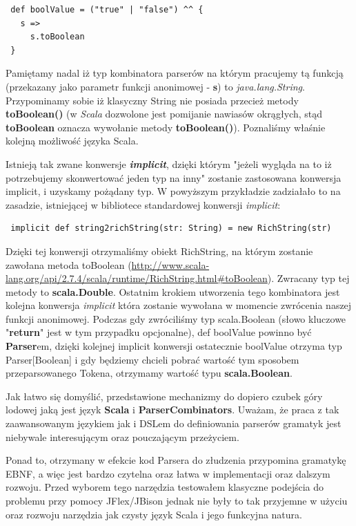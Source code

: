 \documentclass[a4paper]{article}
\begin{document}
\begin{verbatim}
 def boolValue = ("true" | "false") ^^ {
   s =>
     s.toBoolean
 }
\end{verbatim}

Pamiętamy nadal iż typ kombinatora parserów na którym pracujemy tą funkcją (przekazany jako parametr funkcji anonimowej - \textbf{s})
to \textit{java.lang.String}. Przypominamy sobie iż klasyczny String nie posiada przecież metody \textbf{toBoolean()} (w \textit{Scala} dozwolone jest 
pomijanie nawiasów okrągłych, stąd \textbf{toBoolean} oznacza wywołanie metody \textbf{toBoolean()}). Poznaliśmy właśnie kolejną możliwość języka Scala.

Istnieją tak zwane konwersje \textbf{\textit{implicit}}, dzięki którym "jeżeli wygląda na to iż potrzebujemy skonwertować jeden typ na inny" zostanie zastosowana
konwersja implicit, i uzyskamy pożądany typ. W powyższym przykładzie zadziałało to na zasadzie, istniejącej w bibliotece standardowej konwersji \textit{implicit}:

\begin{verbatim}
 implicit def string2richString(str: String) = new RichString(str)
\end{verbatim}

Dzięki tej konwersji otrzymaliśmy obiekt RichString, na którym zostanie zawołana metoda toBoolean (\url{http://www.scala-lang.org/api/2.7.4/scala/runtime/RichString.html#toBoolean}).
Zwracany typ tej metody to \textbf{scala.Double}. Ostatnim krokiem utworzenia tego kombinatora jest kolejna konwersja \textit{implicit} która zostanie 
wywołana w momencie zwrócenia naszej funkcji anonimowej. Podczas gdy zwróciliśmy typ scala.Boolean (słowo kluczowe "\textbf{return}" jest w tym przypadku opcjonalne),
def boolValue powinno być \textbf{Parser}em, dzięki kolejnej implicit konwersji ostatecznie boolValue otrzyma typ Parser[Boolean] i gdy będziemy chcieli pobrać wartość 
tym sposobem przeparsowanego Tokena, otrzymamy wartość typu \textbf{scala.Boolean}. 

Jak łatwo się domyślić, przedstawione mechanizmy do dopiero czubek góry lodowej jaką jest język \textbf{Scala} i \textbf{ParserCombinators}.
Uważam, że praca z tak zaawansowanym językiem jak i DSLem do definiowania parserów gramatyk jest niebywale interesującym oraz pouczającym przeżyciem.

Ponad to, otrzymany w efekcie kod Parsera do złudzenia przypomina gramatykę EBNF, a więc jest bardzo czytelna oraz łatwa w implementacji oraz dalszym rozwoju.
Przed wyborem tego narzędzia testowałem klasyczne podejścia do problemu przy pomocy JFlex/JBison jednak nie były to tak przyjemne w użyciu oraz rozwoju narzędzia 
jak czysty język Scala i jego funkcyjna natura.
\end{document}
